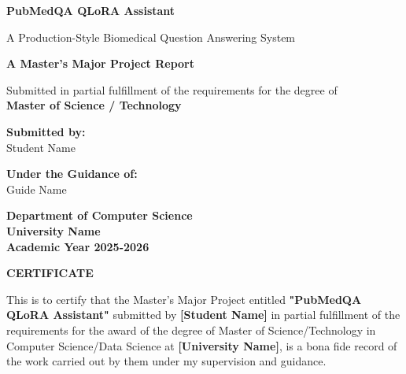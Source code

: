 \documentclass[12pt,a4paper]{report}
\begin{document}
\begin{titlepage}
    \begin{center}
        \vspace*{1cm}
        
        \Huge
        \textbf{PubMedQA QLoRA Assistant}
        
        \vspace{0.5cm}
        \LARGE
        A Production-Style Biomedical Question Answering System
        
        \vspace{1.5cm}
        
        \textbf{A Master's Major Project Report}
        
        \vspace{0.5cm}
        \large
        Submitted in partial fulfillment of the requirements for the degree of\\
        \textbf{Master of Science / Technology}
        
        \vspace{1.5cm}
        
        \textbf{Submitted by:}\\
        Student Name \\
        [Registration Number]
        
        \vspace{1.5cm}
        
        \textbf{Under the Guidance of:}\\
        Guide Name\\
        [Designation]
        
        \vspace{2cm}
        
        
        \large
        \textbf{Department of Computer Science}\\
        \textbf{University Name}\\
        \textbf{Academic Year 2025-2026}
        
    \end{center}
\end{titlepage}

\newpage
\thispagestyle{empty}
\begin{center}
    \Large \textbf{CERTIFICATE}
\end{center}
\vspace{1cm}
This is to certify that the Master's Major Project entitled \textbf{"PubMedQA QLoRA Assistant"} submitted by \textbf{[Student Name]} in partial fulfillment of the requirements for the award of the degree of Master of Science/Technology in Computer Science/Data Science at \textbf{[University Name]}, is a bona fide record of the work carried out by them under my supervision and guidance. 
\end{document}
